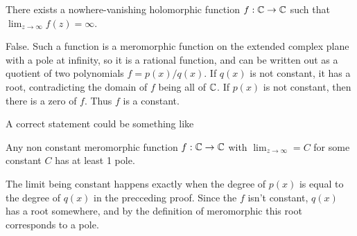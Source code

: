 \documentclass{homework}
\begin{document}
                                                                                                                                      \begin{problem}
                                                                                                                                        There exists a nowhere-vanishing holomorphic function
                                                                                                                                          $f : \mathbb{C} \to \mathbb{C}$ such that $\lim_{z \to \infty} f(z) = \infty$.
                                                                                                                                          \end{problem}
                                                                                                                                          \begin{solution}
                                                                                                                                          False. Such a function is a meromorphic function on the extended complex plane with a pole at infinity, so it is a rational function, and can be written out as a quotient of two polynomials $f=p(x)/q(x)$. If $q(x)$ is not constant, it has a root, contradicting the domain of $f$ being all of $\mathbb{C}$. If $p(x)$ is not constant, then there is a zero of $f$. Thus $f$ is a constant.

                                                                                                                                          A correct statement could be something like 
                                                                                                                                          \begin{theorem}
                                                                                                                                          Any non constant meromorphic function $f:\mathbb{C}\to \mathbb{C}$ with $\lim_{z\to\infty} = C$ for some constant $C$ has at least 1 pole.
                                                                                                                                          \end{theorem}
                                                                                                                                          The limit being constant happens exactly when the degree of $p(x)$ is equal to the degree of $q(x)$ in the precceding proof. Since the $f$ isn't constant, $q(x)$ has a root somewhere, and by the definition of meromorphic this root corresponds to a pole.
                                                                                                                                          \end{solution}

                                                                                                                                          
\end{document}
